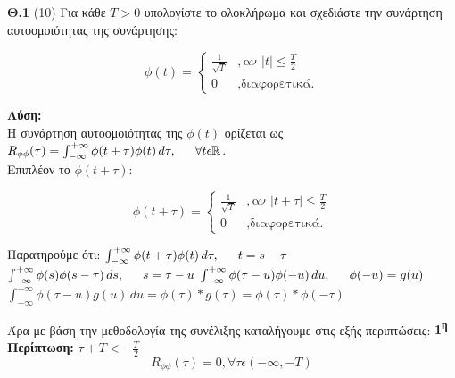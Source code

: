 \newpage


\begin{justify}
{\bf  Θ.1} (10) Για κάθε $T>0$ υπολογίστε το ολοκλήρωμα και σχεδιάστε
την συνάρτηση αυτοομοιότητας της συνάρτησης:
\end{justify}

\[
    \phi(t) =
\left\{
	\begin{array}{ll}
		\frac{1}{\sqrt{T}} &, \mbox{αν } |t| \leq \frac{T}{2} \\
		0 &, \mbox{διαφορετικά.}
	\end{array}
\right.
\]


\begin{justify}
\textbf{Λύση:}\\
H συνάρτηση αυτοομοιότητας της $\phi(t)$ ορίζεται ως $R_{\phi\phi}(\tau)=\int_{-\infty}^{+\infty} \phi(t+\tau)\phi(t)\,d\tau, \hspace{1.5em} \forall t \epsilon \mathbb{R}$.\\
Επιπλέον το $\phi(t+\tau)$:
    
\[
    \phi(t+\tau) =
\left\{
	\begin{array}{ll}
		\frac{1}{\sqrt{T}} &, \mbox{αν } |t+\tau| \leq \frac{T}{2} \\
		0 &, \mbox{διαφορετικά.}
	\end{array}
\right.
\]
\end{justify}

\begin{justify}
    
Παρατηρούμε ότι:
\newline
$\int_{-\infty}^{+\infty} \phi(t+\tau)\phi(t)\,d\tau, 
                                        \hspace{1.5em} t=s-\tau$
\newline
$\int_{-\infty}^{+\infty} \phi(s)\phi(s-\tau)\,ds, 
                                        \hspace{1.5em} s=\tau-u$
\newline
$\int_{-\infty}^{+\infty} \phi(\tau-u)\phi(-u)\,du, 
                                        \hspace{1.5em} \phi(-u)=g(u)$
                                        \newline
$\int_{-\infty}^{+\infty} \phi(\tau-u)g(u)\,du = \phi(\tau)*g(\tau)=\phi(\tau)*\phi(-\tau)$
\end{justify}

\begin{justify}
Άρα με βάση την μεθοδολογία της συνέλιξης καταλήγουμε στις εξής περιπτώσεις:\newline\newline
{\bf 1\textsuperscript{η} Περίπτωση:}  $\tau+T<-\frac{T}{2}$
\[
R_{\phi\phi}(\tau)=0, \forall \tau \epsilon (-\infty,-T)      
\]
\end{justify}

